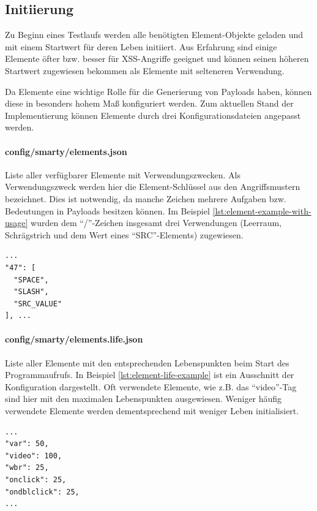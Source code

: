 \subsection{Initiierung}\label{ssec:initializing}

Zu Beginn eines Testlaufs werden alle benötigten Element-Objekte geladen und mit einem Startwert für deren Leben initiiert. Aus Erfahrung sind einige Elemente öfter bzw. besser für \ac{XSS}-Angriffe geeignet und können seinen höheren Startwert zugewiesen bekommen als Elemente mit selteneren Verwendung. 

Da Elemente eine wichtige Rolle für die Generierung von Payloads haben, können diese in besonders hohem Maß konfiguriert werden. Zum aktuellen Stand der Implementierung können Elemente durch drei Konfigurationsdateien angepasst werden.

\paragraph{config/smarty/elements.json} Liste aller verfügbarer Elemente mit Verwendungszwecken. Als Verwendungszweck werden hier die Element-Schlüssel aus den Angriffsmustern bezeichnet. Dies ist notwendig, da manche Zeichen mehrere Aufgaben bzw. Bedeutungen in Payloads besitzen können. Im Beispiel \ref{lst:element-example-with-usage} wurden dem ``/''-Zeichen insgesamt drei Verwendungen (Leerraum, Schrägstrich und dem Wert eines ``SRC''-Elements) zugewiesen.

\begin{lstlisting}[caption={SmartGrazer: Auszug der Konfigurationsdatei ``elements.json''},label=lst:element-example-with-usage]
...
"47": [
  "SPACE",
  "SLASH",
  "SRC_VALUE"
], ...
\end{lstlisting}

\paragraph{config/smarty/elements.life.json} Liste aller Elemente mit den entsprechenden Lebenspunkten beim Start des Programmaufrufs. In Beispiel \ref{lst:element-life-example} ist ein Ausschnitt der Konfiguration dargestellt. Oft verwendete Elemente, wie z.B. das ``video''-Tag sind hier mit den maximalen Lebenspunkten ausgewiesen. Weniger häufig verwendete Elemente werden dementsprechend mit weniger Leben initialisiert.
	
\begin{lstlisting}[caption={SmartGrazer: Auszug der Konfigurationsdatei ``elements.life.json''},label=lst:element-life-example]
...
"var": 50,
"video": 100,
"wbr": 25,
"onclick": 25,
"ondblclick": 25,
...
\end{lstlisting}

